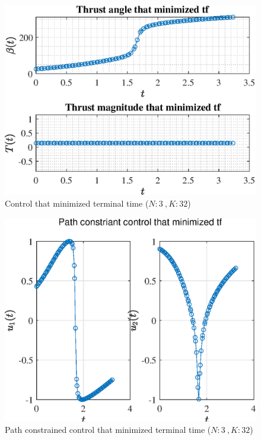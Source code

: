 \documentclass[]{article}
\begin{document}
	\begin{figure}
		\centering
		\includegraphics[scale=0.75]{control_N3_K32_C3_tf.eps}
		\caption{Control that minimized terminal time (\(N:3\ , K:32\))}
		\label{fig:control_N3_K32_C3_tf}
	\end{figure}
	\begin{figure}
		\centering
		\includegraphics[scale=0.75]{path_N3_K32_C3_tf.eps}
		\caption{Path constrained control that minimized terminal time (\(N:3\ , K:32\))}
		\label{fig:path_N3_K32_C3_tf}
	\end{figure}
\end{document}
